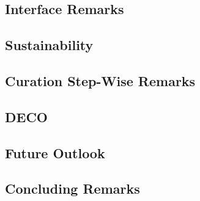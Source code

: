    \subsection{Interface Remarks}
   \subsection{Sustainability}
   \subsection{Curation Step-Wise Remarks}
   \subsection{DECO}
   \subsection{Future Outlook}
   \subsection{Concluding Remarks}
